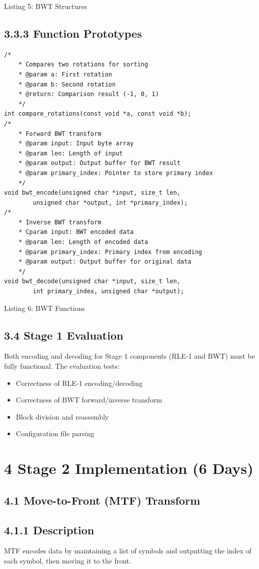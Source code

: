 \documentclass[10pt]{article}
\begin{document}
Listing 5: BWT Structures

\subsection*{3.3.3 Function Prototypes}
\begin{verbatim}
/*
    * Compares two rotations for sorting
    * @param a: First rotation
    * @param b: Second rotation
    * @return: Comparison result (-1, 0, 1)
    */
int compare_rotations(const void *a, const void *b);
/*
    * Forward BWT transform
    * @param input: Input byte array
    * @param len: Length of input
    * @param output: Output buffer for BWT result
    * @param primary_index: Pointer to store primary index
    */
void bwt_encode(unsigned char *input, size_t len,
        unsigned char *output, int *primary_index);
/*
    * Inverse BWT transform
    * Cparam input: BWT encoded data
    * @param len: Length of encoded data
    * @param primary_index: Primary index from encoding
    * @param output: Output buffer for original data
    */
void bwt_decode(unsigned char *input, size_t len,
        int primary_index, unsigned char *output);
\end{verbatim}

Listing 6: BWT Functions

\subsection*{3.4 Stage 1 Evaluation}
Both encoding and decoding for Stage 1 components (RLE-1 and BWT) must be fully functional. The evaluation tests:

\begin{itemize}
  \item Correctness of RLE-1 encoding/decoding
  \item Correctness of BWT forward/inverse transform
  \item Block division and reassembly
  \item Configuration file parsing
\end{itemize}

\section*{4 Stage 2 Implementation (6 Days)}
\subsection*{4.1 Move-to-Front (MTF) Transform}
\subsection*{4.1.1 Description}
MTF encodes data by maintaining a list of symbols and outputting the index of each symbol, then moving it to the front.
\end{document}
